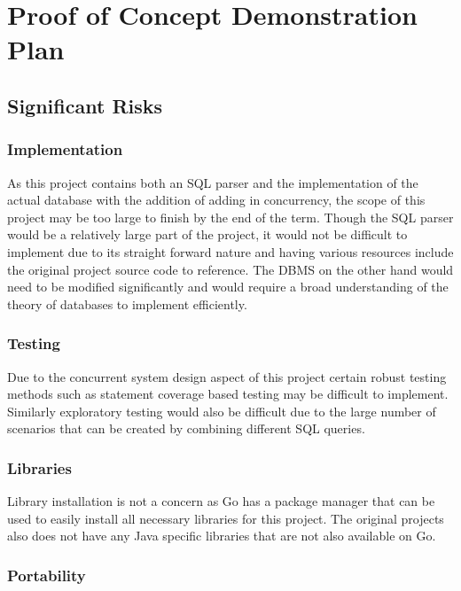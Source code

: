 \documentclass[12pt,letterpaper]{article}
\begin{document}
\section{Proof of Concept Demonstration Plan}

\subsection{Significant Risks}

\subsubsection{Implementation}

As this project contains both an SQL parser and the implementation of the actual database with the addition of adding in concurrency, the scope of this project may be too large to finish by the end of the term. Though the SQL parser would be a relatively large part of the project, it would not be difficult to implement due to its straight forward nature and having various resources include the original project source code to reference. The DBMS on the other hand would need to be modified significantly and would require a broad understanding of the theory of databases to implement efficiently.

\subsubsection{Testing}

Due to the concurrent system design aspect of this project certain robust testing methods such as statement coverage based testing may be difficult to implement. Similarly exploratory testing would also be difficult due to the large number of scenarios that can be created by combining different SQL queries.

\subsubsection{Libraries}

Library installation is not a concern as Go has a package manager that can be used to easily install all necessary libraries for this project. The original projects also does not have any Java specific libraries that are not also available on Go.

\subsubsection{Portability}
\end{document}
